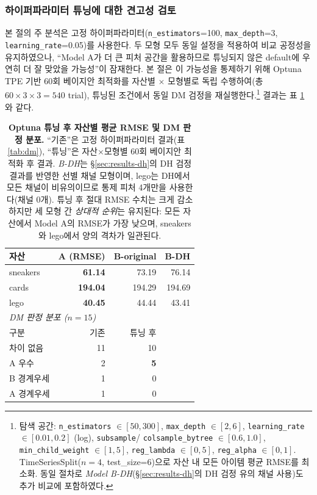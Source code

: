 \documentclass[11pt, a4paper, twocolumn]{article}
\begin{document}
\subsubsection*{하이퍼파라미터 튜닝에 대한 견고성 검토}
\label{sec:results-tuning}

본 절의 주 분석은 고정 하이퍼파라미터(\texttt{n\_estimators}=100,
\texttt{max\_depth}=3, \texttt{learning\_rate}=0.05)를 사용한다. 두 모형
모두 동일 설정을 적용하여 비교 공정성을 유지하였으나, ``Model A가 더
큰 피처 공간을 활용하므로 튜닝되지 않은 default에 우연히 더 잘 맞았을
가능성''이 잠재한다. 본 절은 이 가능성을 통제하기 위해 Optuna
TPE\citep{akibasanouama2019} 기반 60회 베이지안 최적화를 자산별
$\times$ 모형별로 독립 수행하여(총 $60\times 3\times 3 = 540$ trial),
튜닝된 조건에서 동일 DM 검정을 재실행한다.\footnote{탐색 공간:
\texttt{n\_estimators} $\in [50,300]$, \texttt{max\_depth} $\in [2,6]$,
\texttt{learning\_rate} $\in [0.01,0.2]$ (log), \texttt{subsample}/
\texttt{colsample\_bytree} $\in [0.6,1.0]$, \texttt{min\_child\_weight}
$\in [1,5]$, \texttt{reg\_lambda} $\in [0,5]$, \texttt{reg\_alpha} $\in [0,1]$.
TimeSeriesSplit($n=4$, test\_size=6)으로 자산 내 모든 아이템 평균 RMSE를
최소화. 동일 절차로 \emph{Model B-DH}(\S\ref{sec:results-dh}의 DH 검정
유의 채널 사용)도 추가 비교에 포함하였다.} 결과는 표
\ref{tab:tuned}와 같다.

\begin{table}[!t]
\centering\small
\caption[XGBoost 튜닝 후 DM 결과]{\textbf{Optuna 튜닝 후 자산별 평균
RMSE 및 DM 판정 분포.} ``기존''은 고정 하이퍼파라미터 결과(표
\ref{tab:dm}), ``튜닝''은 자산$\times$모형별 60회 베이지안 최적화 후
결과. \textit{B-DH}는 \S\ref{sec:results-dh}의 DH 검정 결과를 반영한
선별 채널 모형이며, lego는 DH에서 모든 채널이 비유의이므로 통제 피처
4개만을 사용한다(채널 0개). 튜닝 후 절대 RMSE 수치는 크게 감소하지만
세 모형 간 \emph{상대적 순위}는 유지된다: 모든 자산에서 Model A의 RMSE가
가장 낮으며, sneakers와 lego에서 양의 격차가 일관된다.}
\label{tab:tuned}
\begin{tabular}{lrrr}
\toprule
자산 & A (RMSE) & B-original & B-DH \\
\midrule
sneakers & \textbf{61.14} & 73.19 & 76.14 \\
cards    & \textbf{194.04} & 194.29 & 194.69 \\
lego     & \textbf{40.45} & 44.44 & 43.41 \\
\midrule
\multicolumn{4}{l}{\textit{DM 판정 분포 ($n=15$)}} \\
구분 & 기존 & 튜닝 후 & \\
\midrule
차이 없음 & 11 & 10 & \\
A 우수 & 2 & \textbf{5} & \\
B 경계우세 & 1 & 0 & \\
A 경계우세 & 1 & 0 & \\
\bottomrule
\end{tabular}
\end{table}
\end{document}
